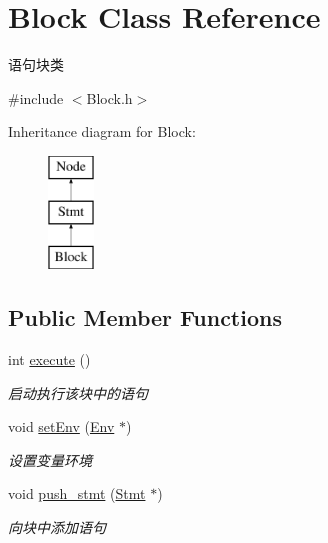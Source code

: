 \hypertarget{class_block}{}\section{Block Class Reference}
\label{class_block}


语句块类  




{\ttfamily \#include $<$Block.\+h$>$}

Inheritance diagram for Block\+:\begin{figure}[H]
\begin{center}
\leavevmode
\includegraphics[height=3.000000cm]{class_block}
\end{center}
\end{figure}
\subsection*{Public Member Functions}
\begin{DoxyCompactItemize}
\item 
\mbox{\label{class_block_a8e03f15df4e43cd6c802341c3bda6b33}} 
int \hyperlink{class_block_a8e03f15df4e43cd6c802341c3bda6b33}{execute} ()
\begin{DoxyCompactList}\small\item\em 启动执行该块中的语句 \end{DoxyCompactList}\item 
\mbox{\label{class_block_aa48058bd426766898bf31df828b3dac2}} 
void \hyperlink{class_block_aa48058bd426766898bf31df828b3dac2}{set\+Env} (\hyperlink{class_env}{Env} $\ast$)
\begin{DoxyCompactList}\small\item\em 设置变量环境 \end{DoxyCompactList}\item 
\mbox{\label{class_block_acd012454c035cc7e0d508365752221ff}} 
void \hyperlink{class_block_acd012454c035cc7e0d508365752221ff}{push\+\_\+stmt} (\hyperlink{class_stmt}{Stmt} $\ast$)
\begin{DoxyCompactList}\small\item\em 向块中添加语句 \end{DoxyCompactList}\end{DoxyCompactItemize}

